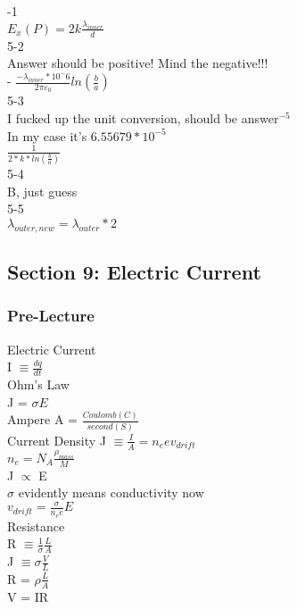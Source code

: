 \documentclass{article}
\begin{document}
\vspace{2mm}

-1\\
$E_x(P) = 2k \frac{\lambda_{inner}}{d}$ \\
5-2\\
Answer should be positive! Mind the negative!!!\\
- $\frac{-\lambda_{inner}*10^-6}{2 \pi \varepsilon_0} ln(\frac{b}{a})$ \\
5-3\\
I fucked up the unit conversion, should be answer$^{-5}$ \\
In my case it's $6.55679*10^{-5}$\\
$\frac{1}{2*k*ln(\frac{b}{a})}$ \\
5-4\\
B, just guess \\
5-5\\
$\lambda_{outer,new} = \lambda_{outer} * 2$

\subsection{Section 9: Electric Current}
\subsubsection{Pre-Lecture}

\noindent 
Electric Current  \\
I $\equiv \frac{dq}{dt} $ \\
Ohm's Law \\
J = $\sigma E$ \\
Ampere A = $\frac{Coulomb (C)}{second (S)} $\\
Current Density J $\equiv \frac{I}{A} = n_e e v_{drift}$ \\
$n_e = N_A \frac{\rho_{mass}}{M}$ \\
J $\propto$ E \\
$\sigma$ evidently means conductivity now \\
$v_{drift} = \frac{\sigma}{n_ee}E$ \\
Resistance \\
R $\equiv \frac{1}{\sigma} \frac{L}{A}$ \\
J $\equiv \sigma \frac{V}{L} $ \\
R = $\rho \frac{L}{A}$ \\
V = IR

\vspace{2mm}
\end{document}
